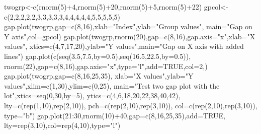 \begin{Examples}
\begin{ExampleCode}
 twogrp<-c(rnorm(5)+4,rnorm(5)+20,rnorm(5)+5,rnorm(5)+22)
 gpcol<-c(2,2,2,2,2,3,3,3,3,3,4,4,4,4,4,5,5,5,5,5)
 gap.plot(twogrp,gap=c(8,16),xlab="Index",ylab="Group values",
  main="Gap on Y axis",col=gpcol)
 gap.plot(twogrp,rnorm(20),gap=c(8,16),gap.axis="x",xlab="X values",
  xtics=c(4,7,17,20),ylab="Y values",main="Gap on X axis with added lines")
 gap.plot(c(seq(3.5,7.5,by=0.5),seq(16.5,22.5,by=0.5)),
  rnorm(22),gap=c(8,16),gap.axis="x",type="l",add=TRUE,col=2,)
 gap.plot(twogrp,gap=c(8,16,25,35),
 xlab="X values",ylab="Y values",xlim=c(1,30),ylim=c(0,25),
 main="Test two gap plot with the lot",xtics=seq(0,30,by=5),
 ytics=c(4,6,18,20,22,38,40,42),
 lty=c(rep(1,10),rep(2,10)),
 pch=c(rep(2,10),rep(3,10)),
 col=c(rep(2,10),rep(3,10)),
 type="b")
 gap.plot(21:30,rnorm(10)+40,gap=c(8,16,25,35),add=TRUE,
  lty=rep(3,10),col=rep(4,10),type="l")
\end{ExampleCode}
\end{Examples}

